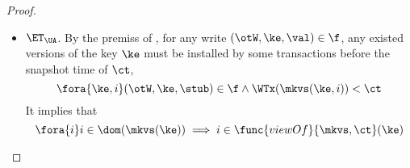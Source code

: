 \begin{proof}
\begin{itemize}
        \item \( \ET_\UA \).
            By the premiss of , for any write \( (\otW, \ke, \val) \in \f \), any existed versions of the key \( \ke \)
            must be installed by some transactions before the snapshot time of \( \ct \),
            \[
                \fora{\ke,i} (\otW, \ke, \stub) \in \f \land \WTx(\mkvs(\ke,i)) < \ct 
            \]
            It implies that 
            \[ 
                \fora{i} i \in \dom(\mkvs(\ke)) \implies i \in \func{viewOf}{\mkvs,\ct}(\ke) 
            \]
    \end{itemize}
\end{proof}
